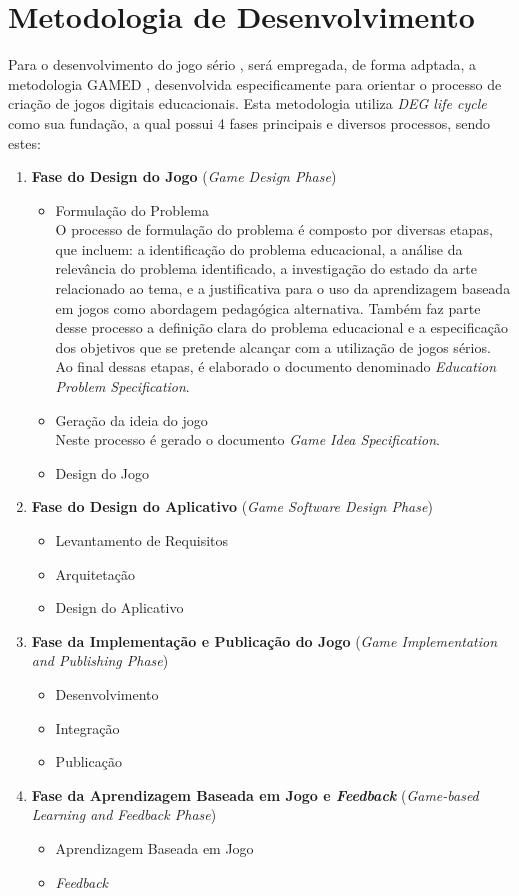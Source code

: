 \section{Metodologia de Desenvolvimento}

Para o desenvolvimento do jogo sério \cite{mouaheb2012serious}, será empregada,
de forma adptada, a metodologia GAMED \cite{aslan2015gamed}, desenvolvida
especificamente para orientar o processo de criação de jogos digitais
educacionais. Esta metodologia utiliza \emph{DEG life cycle} como sua fundação,
a qual possui 4 fases principais e diversos processos, sendo estes:

\begin{enumerate}
  \item \textbf{Fase do Design do Jogo} (\emph{Game Design Phase})
  \begin{itemize}
    \item Formulação do Problema \\
      O processo de formulação do problema é composto por diversas etapas, que
      incluem: a identificação do problema educacional, a análise da relevância do
      problema identificado, a investigação do estado da arte relacionado ao tema, e
      a justificativa para o uso da aprendizagem baseada em jogos como abordagem
      pedagógica alternativa. Também faz parte desse processo a definição clara do
      problema educacional e a especificação dos objetivos que se pretende alcançar
      com a utilização de jogos sérios. Ao final dessas etapas, é elaborado o
      documento denominado \emph{Education Problem Specification}.
    \item Geração da ideia do jogo \\
      Neste processo é gerado o documento \emph{Game Idea Specification}.
    \item Design do Jogo
  \end{itemize}
  \item \textbf{Fase do Design do Aplicativo} (\emph{Game Software Design Phase})
  \begin{itemize}
    \item Levantamento de Requisitos
    \item Arquitetação
    \item Design do Aplicativo
  \end{itemize}
  \item \textbf{Fase da Implementação e Publicação do Jogo} (\emph{Game Implementation and Publishing Phase})
  \begin{itemize}
    \item Desenvolvimento
    \item Integração
    \item Publicação
  \end{itemize}
  \item \textbf{Fase da Aprendizagem Baseada em Jogo e \emph{Feedback}} (\emph{Game-based Learning and Feedback Phase})
  \begin{itemize}
    \item Aprendizagem Baseada em Jogo
    \item \emph{Feedback}
  \end{itemize}
\end{enumerate}

% 
% 
